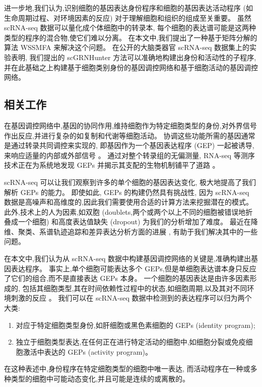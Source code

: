 进一步地,我们认为,识别细胞的基因表达身份程序和细胞的基因表达活动程序 (如生命周期过程、对环境因素的反应) 
对于理解细胞和组织的组成至关重要。
虽然 scRNA-seq 数据可以量化成个体细胞中的转录本,
每个细胞的表达谱可能是这两种类型的程序的混合物,使它们难以分离。
在本文中,我们提出了一种基于矩阵分解的算法 WSSMFA 来解决这个问题。
在公开的大脑类器官 scRNA-seq 数据集上的实验表明,
我们提出的 scGRNHunter 方法可以准确地构建出身份和活动性的子程序, 
并在此基础之上构建基于细胞类别身份的基因调控网络和基于细胞活动的基因调控网络。

\subsection{相关工作}
在基因调控网络中,基因的协同作用,维持细胞作为特定细胞类型的身份,对外界信号作出反应,并进行复杂的如复制和代谢等细胞活动。
协调这些功能所需的基因通常是通过转录共同调控来实现的,
即基因作为一个基因表达程序 (GEP) 一起被诱导,
来响应适量的内部或外部信号 \cite{eisen1998cluster,segal2003module}。
通过对整个转录组的无偏测量, RNA-seq 等测序技术正在为系统地发现 GEPs 并揭示其支配的生物机制铺平了道路 \cite{liberzon2015molecular}。

scRNA-seq 可以让我们观察到许多的单个细胞的基因表达变化,
极大地提高了我们解析 GEPs 的能力。
即使如此, GEPs 的构建仍然具有挑战性,
因为 scRNA-seq 数据是高噪声和高维度的,因此我们需要使用合适的计算方法来挖掘潜在的模式。
此外,技术上的人为因素,如双胞 (doublets,两个或两个以上不同的细胞被错误地折叠成一个细胞) 和高度表达值缺失 (dropout) 为我们的分析增加了难度。
最近在降维、聚类、系谱轨迹追踪和差异表达分析方面的进展 \cite{amir2013visne,kharchenko2014bayesian,satija2015spatial,trapnell2014dynamics},
有助于我们解决其中的一些问题。

在本文中,我们认为从 scRNA-seq 数据中构建基因调控网络的关键是,准确构建出基因表达程序。
事实上,单个细胞可能表达多个 GEPs,但是单细胞表达谱本身只反应了它们的组合,而不是直接表达 GEPs 本身。
一个细胞的基因表达是由许多因素形成的,
包括其细胞类型,其在时间依赖性过程中的状态,如细胞周期,以及其对不同环境刺激的反应 \cite{wagner2016revealing}。
我们可以在 scRNA-seq 数据中检测到的表达程序可以归为两个大类:
\begin{enumerate}
    \item 对应于特定细胞类型身份,如肝细胞或黑色素细胞的 GEPs (identity program);
    \item 独立于细胞类型表达,在任何正在进行特定活动的细胞中,如细胞分裂或免疫细胞激活中表达的 GEPs (activity program)。
\end{enumerate}
在这种表述中,身份程序在特定细胞类型的细胞中唯一表达,
而活动程序在一种或多种类型的细胞中可能动态变化,并且可能是连续的或离散的。

